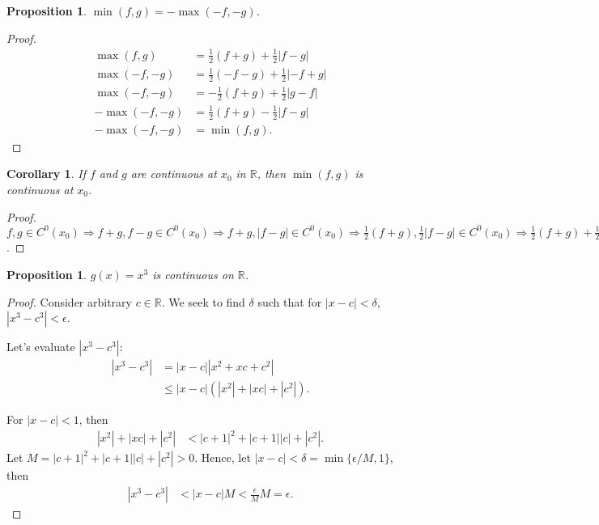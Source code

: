\documentclass{article}
\newtheorem{proposition}[thm]{Proposition}
\newtheorem{corollary}[thm]{Corollary}
\begin{document}
\begin{proposition}
    $\min(f,g)=-\max(-f,-g)$.
\end{proposition}
\begin{proof}
    \begin{align*}
        \max(f,g) & = \frac{1}{2}(f+g)+\frac{1}{2}|f-g| \\
        \max(-f,-g) & = \frac{1}{2}(-f-g)+\frac{1}{2}|-f+g| \\
        \max(-f,-g) & = - \frac{1}{2}(f+g)+\frac{1}{2}|g-f| \\
        -\max(-f,-g) & = \frac{1}{2}(f+g)-\frac{1}{2}|f-g| \\
        -\max(-f,-g) & = \min(f,g).
    \end{align*}
\end{proof}

\begin{corollary}
    If $f$ and $g$ are continuous at $x_0$ in $\mathbb{R}$, then $\min(f,g)$ is continuous at $x_0$.
\end{corollary}
\begin{proof}
    $f,g\in C^0(x_0)\Rightarrow f+g, f-g \in C^0(x_0)\Rightarrow f+g, |f-g| \in C^0(x_0)
    \Rightarrow \frac{1}{2}(f+g), \frac{1}{2}|f-g| \in C^0(x_0)
    \Rightarrow \frac{1}{2}(f+g)+\frac{1}{2}|f-g| \in C^0(x_0)
    \Rightarrow \min(f,g) \in C^0(x_0)$.
\end{proof}

\begin{proposition}
    $g(x)=x^3$ is continuous on $\mathbb{R}$.
\end{proposition}
\begin{proof}
    Consider arbitrary $c\in\mathbb{R}$. We seek to find $\delta$ such that for $|x-c|<\delta$, 
    $|x^3-c^3|<\epsilon$.

    Let's evaluate $|x^3-c^3|$:
    \begin{align*}
        |x^3-c^3| & = |x-c||x^2+xc+c^2| \\
        & \le |x-c|\left(|x^2|+|xc|+|c^2|\right).
    \end{align*}

    For $|x-c|<1$, then 
    \begin{align*}
        |x^2|+|xc|+|c^2| & < |c+1|^2 + |c+1||c| + |c^2|.
    \end{align*}
    Let $M = |c+1|^2 + |c+1||c| + |c^2|>0$. Hence, let $|x-c|<\delta = \min\{\epsilon/M,1\}$, then
    \begin{align*}
        |x^3-c^3| & < |x-c|M < \frac{\epsilon}{M}M = \epsilon.
    \end{align*}
\end{proof}
\end{document}
